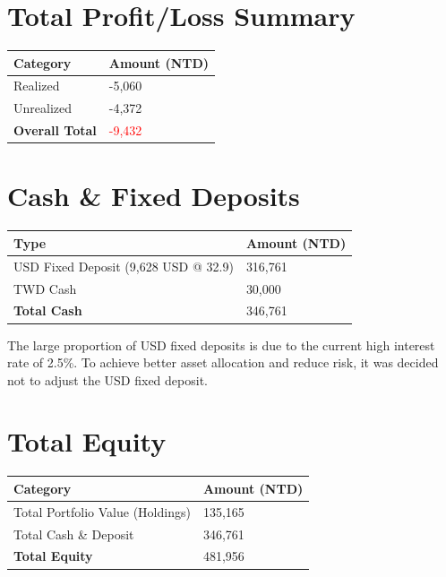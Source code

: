\documentclass[a4paper,12pt]{article}
\begin{document}
\section{Total Profit/Loss Summary}
\begin{longtable}{ll}
    \toprule
    Category & Amount (NTD) \\
    \midrule
    Realized   & -5,060 \\
    Unrealized & -4,372 \\
    \midrule
    \textbf{Overall Total} & \textcolor{red}{-9,432} \\
    \bottomrule
\end{longtable}

\section{Cash \& Fixed Deposits}
\begin{longtable}{ll}
    \toprule
    Type & Amount (NTD) \\
    \midrule
    USD Fixed Deposit (9,628 USD @ 32.9) & 316,761 \\
    TWD Cash                             & 30,000 \\
    \bottomrule
    \textbf{Total Cash} & 346,761 \\
\end{longtable}

\noindent
The large proportion of USD fixed deposits is due to the current high interest rate of 2.5\%. To achieve better asset allocation and reduce risk, it was decided not to adjust the USD fixed deposit.

\section{Total Equity}
\begin{longtable}{ll}
    \toprule
    Category & Amount (NTD) \\
    \midrule
    Total Portfolio Value (Holdings) & 135,165 \\
    Total Cash \& Deposit            & 346,761 \\
    \bottomrule
    \textbf{Total Equity} & 481,956 \\
\end{longtable}
\end{document}
